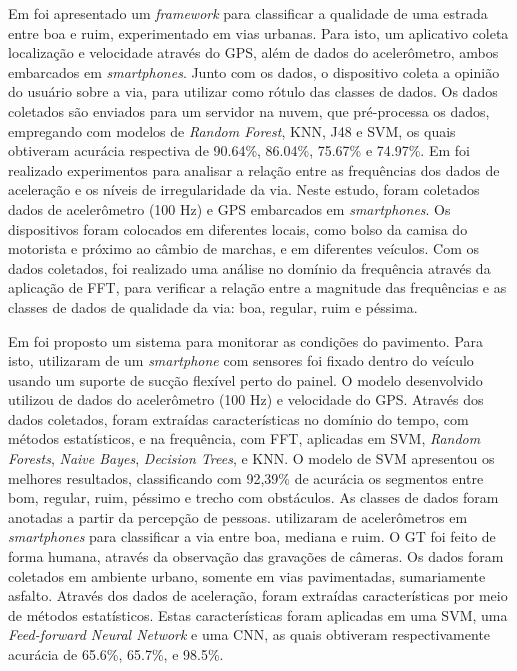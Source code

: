 Em \cite{Nunes2019} foi apresentado um \textit{framework} para classificar a qualidade de uma estrada entre boa e ruim, experimentado em vias urbanas. Para isto, um aplicativo coleta localização e velocidade através do GPS, além de dados do acelerômetro, ambos embarcados em \textit{smartphones}. Junto com os dados, o dispositivo coleta a opinião do usuário sobre a via, para utilizar como rótulo das classes de dados. Os dados coletados são enviados para um servidor na nuvem, que pré-processa os dados, empregando com modelos de \textit{Random Forest}, KNN, J48 e SVM, os quais obtiveram acurácia respectiva de 90.64\%, 86.04\%, 75.67\% e 74.97\%. Em \cite{Douangphachanh2014_1} foi realizado experimentos para analisar a relação entre as frequências dos dados de aceleração e os níveis de irregularidade da via. Neste estudo, foram coletados dados de acelerômetro (100 Hz) e GPS embarcados em \textit{smartphones}. Os dispositivos foram colocados em diferentes locais, como bolso da camisa do motorista e próximo ao câmbio de marchas, e em diferentes veículos. Com os dados coletados, foi realizado uma análise no domínio da frequência através da aplicação de FFT, para verificar a relação entre a magnitude das frequências e as classes de dados de qualidade da via: boa, regular, ruim e péssima.

Em \cite{Souza2018_1} foi proposto um sistema para monitorar as condições do pavimento. Para isto, utilizaram de um \textit{smartphone} com sensores foi fixado dentro do veículo usando um suporte de sucção flexível perto do painel. O modelo desenvolvido utilizou de dados do acelerômetro (100 Hz) e velocidade do GPS. Através dos dados coletados, foram extraídas características no domínio do tempo, com métodos estatísticos, e na frequência, com FFT, aplicadas em SVM, \textit{Random Forests}, \textit{Naive Bayes}, \textit{Decision Trees}, e KNN. O modelo de SVM apresentou os melhores resultados, classificando com 92,39\% de acurácia os segmentos entre bom, regular, ruim, péssimo e trecho com obstáculos. As classes de dados foram anotadas a partir da percepção de pessoas. \cite{Tiwari2020} utilizaram de acelerômetros em \textit{smartphones} para classificar a via entre boa, mediana e ruim. O GT foi feito de forma humana, através da observação das gravações de câmeras. Os dados foram coletados em ambiente urbano, somente em vias pavimentadas, sumariamente asfalto. Através dos dados de aceleração, foram extraídas características por meio de métodos estatísticos. Estas características foram aplicadas em uma SVM, uma \textit{Feed-forward Neural Network} e uma CNN, as quais obtiveram respectivamente acurácia de 65.6\%, 65.7\%, e 98.5\%.

